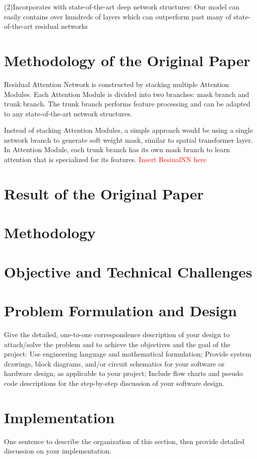 \documentclass{article}
\begin{document}
\begin{multicols}{2}
(2)Incorporates with state-of-the-art deep network structures:
Our model can easily contains over hundreds of layers which can outperform past many of state-of-the-art residual networks


\section{Methodology of the Original Paper}
Residual Attention Network is constructed by stacking multiple Attention Modules. Each Attention Module is divided into two branches: mask branch and trunk branch. The trunk branch performs feature processing and can be adapted to any state-of-the-art network structures.

Instead of stacking Attention Modules, a
simple approach would be using a single network branch
to generate soft weight mask, similar to spatial transformer
layer. In Attention Module, each trunk branch has its own
mask branch to learn attention that is specialized for its features.
\textcolor{red}{Insert ResiualNN here}


\section{Result of the Original Paper}

\section{Methodology}

\section{Objective and Technical Challenges}


\section{Problem Formulation and Design}
Give the detailed, one-to-one correspondence description of your design to attach/solve the problem and to achieve the objectives and the goal of the project:
Use engineering language and mathematical formulation;
Provide system drawings, block diagrams, and/or circuit schematics for your software or hardware design, as applicable to your project; 
Include flow charts and pseudo code descriptions for the step-by-step discussion of your software design.


\section{Implementation}
One sentence to describe the organization of this section, then provide detailed discussion on your implementation. 


\end{multicols}
\end{document}
